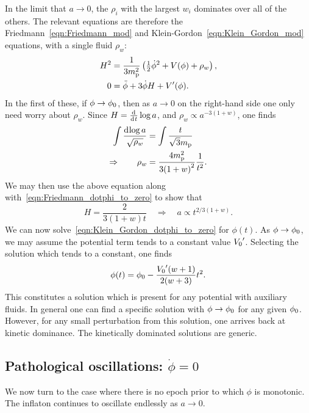 In the limit that $a\to 0$, the $\rho_i$ with the largest $w_i$ dominates over all of the others. The relevant equations are therefore the Friedmann~\eqref{eqn:Friedmann_mod} and Klein-Gordon~\eqref{eqn:Klein_Gordon_mod} equations, with a single fluid $\rho_w$:
%
\begin{align}
  H^2
  &=
  \frac{1}{3m_{\mathrm{p}}^2}\left({\textstyle\frac{1}{2}}\dot{\phi}^2
  + V(\phi)
  + \rho_w \right),
  \label{eqn:Friedmann_dotphi_to_zero} \\
  0
  &=
  \ddot{\phi} +3\dot{\phi}H + V^\prime(\phi).
  \label{eqn:Klein_Gordon_dotphi_to_zero}
\end{align}
%
In the first of these, if $\phi\to\phi_0$, then as $a\to0$ on the right-hand side one only need worry about $\rho_w$. Since $H=\frac{\operatorname{d}^{}\!{}}{\operatorname{d}^{}\!{t}}\log a$, and $\rho_w\propto a^{-3(1+w)}$, one finds
%
\begin{align}
  \int\frac{\operatorname{d}^{}\!{\log a}}{\sqrt{\rho_w}}
  &=
  \int\frac{t}{\sqrt3m_{\mathrm{p}}}
  \\
  \Rightarrow \qquad \rho_w
  &=
  \frac{4m_{\mathrm{p}}^2}{3{(1+w)}^2} \frac{1}{t^2}.
  \label{eqn:rho_dotphi_to_zero}
\end{align}
%
We may then use the above equation along with~\eqref{eqn:Friedmann_dotphi_to_zero} to show that
%
\begin{equation}
  H = \frac{2}{3(1+w) t}
  \quad
  \Rightarrow \quad a\propto t^{2/3(1+w)}.
  \label{eqn:H_dotphi_to_zero}
\end{equation}
%
We can now solve~\eqref{eqn:Klein_Gordon_dotphi_to_zero} for $\phi(t)$.  As $\phi\to\phi_0$, we may assume the potential term tends to a constant value ${{V_0}^\prime}$. Selecting the solution which tends to a constant, one finds
%
\begin{equation}
  \phi(t) = \phi_0 -\frac{{{V_0}^\prime}(w+1)}{2(w+3)}t^2.
\end{equation}
%
This constitutes a solution which is present for any potential with auxiliary fluids. In general one can find a specific solution with $\phi\to\phi_0$ for any given $\phi_0$. However, for any small perturbation from this solution, one arrives back at kinetic dominance. The kinetically dominated solutions are generic. 












\subsection{Pathological oscillations: $\dot{\phi}=0$}
We now turn to the case where there is no epoch prior to which $\phi$ is monotonic. The inflaton continues to oscillate endlessly as $a\to0$. 


